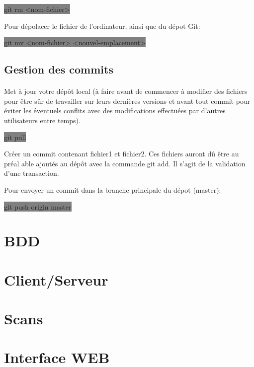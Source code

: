 \documentclass[11pt,a4paper,titlepage, oneside]{article}
\begin{document}
			\colorbox{gray}{git rm <nom-fichier>}

			Pour dépolacer le fichier de l'ordinateur, ainsi que du dépot Git:
			
			\colorbox{gray}{git mv <nom-fichier> <nouvel-emplacement>}

	\subsection{{\color{red} Gestion des commits}}

		\paragraph{}
			Met à jour votre dépôt local (à faire avant de commencer à modifier des fichiers pour être sûr de travailler sur leurs dernières versions et avant tout commit pour éviter les éventuels conflits avec des modifications effectuées par d'autres utilisateurs entre temps). 

			\colorbox{gray}{git pull}

			Créer un commit contenant fichier1 et fichier2. Ces fichiers auront dû être au préal able ajoutés au dépôt avec la commande git add. Il s'agit de la validation d'une transaction. 

			Pour envoyer un commit dans la branche principale du dépot (master):
			
			\colorbox{gray}{git push origin master}	

\newpage
\section{{\color{red} BDD}}
	\paragraph{}
\newpage
\section{{\color{red} Client/Serveur}}

\newpage
\section{{\color{red} Scans}}

\newpage
\section{{\color{red} Interface WEB}}
\end{document}
